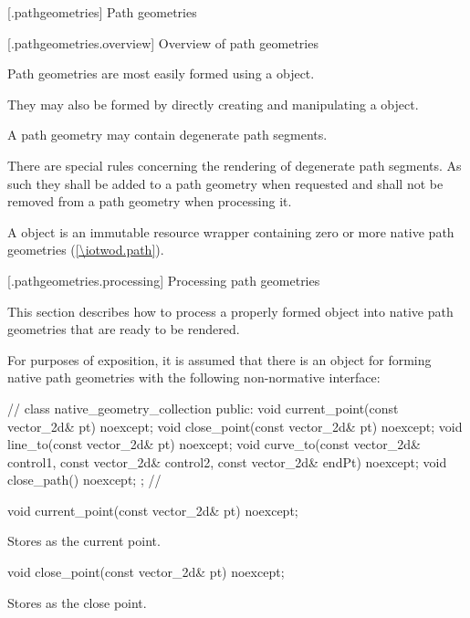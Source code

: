  [\iotwod.pathgeometries] {Path geometries}

 [\iotwod.pathgeometries.overview] {Overview of path geometries}

\pnum
Path geometries are most easily formed using a  object.

\pnum
They may also be formed by directly creating and manipulating a  object.

\pnum
A path geometry may contain degenerate path segments.

\pnum
There are special rules concerning the rendering of degenerate path segments. As such they shall be added to a path geometry when requested and shall not be removed from a path geometry when processing it.

\pnum
A  object is an immutable resource wrapper containing zero or more native path geometries (\ref{\iotwod.path}).

 [\iotwod.pathgeometries.processing] {Processing path geometries}

\pnum
This section describes how to process a properly formed  object into native path geometries that are ready to be rendered.

\pnum
For purposes of exposition, it is assumed that there is an object for forming native path geometries with the following non-normative interface:

\begin{codeblock}
// \expos
class native_geometry_collection {
public:
  void current_point(const vector_2d& pt) noexcept;
  void close_point(const vector_2d& pt) noexcept;
  void line_to(const vector_2d& pt) noexcept;
  void curve_to(const vector_2d& control1, const vector_2d& control2,
    const vector_2d& endPt) noexcept;
  void close_path() noexcept;
};
// \expos
\end{codeblock}

\begin{itemdecl}
  void current_point(const vector_2d& pt) noexcept;
\end{itemdecl}
\begin{itemdescr}
	\pnum
	\effects
	Stores  as the current point.

\end{itemdescr}

\begin{itemdecl}
  void close_point(const vector_2d& pt) noexcept;
\end{itemdecl}
\begin{itemdescr}
	\pnum
	\effects
	Stores  as the close point.

\end{itemdescr}


